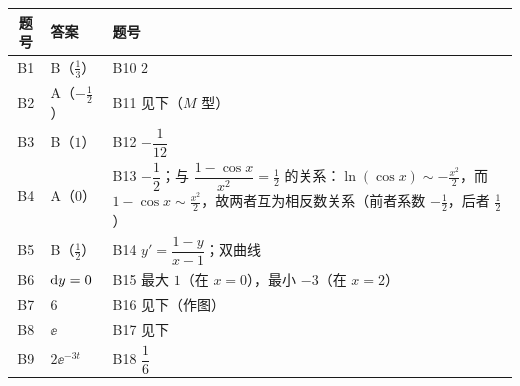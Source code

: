 \begin{center}
\small\setlength{\tabcolsep}{5pt}
\begin{tabularx}{\linewidth}{c|p{3.9cm}|X}
\toprule
题号 & 答案 & 题号\\
\midrule
B1 & B（$\frac13$）& B10 $2$\\
B2 & A（$-\frac12$）& B11 见下（$M$ 型）\\
B3 & B（$1$）& B12 $-\dfrac{1}{12}$\\
B4 & A（$0$）& B13 $-\dfrac{1}{2}$；与 $\dfrac{1-\cos x}{x^{2}}=\frac12$ 的关系：$\ln(\cos x)\sim-\frac{x^{2}}2$，而 $1-\cos x\sim\frac{x^{2}}2$，故两者互为相反数关系（前者系数 $-\frac12$，后者 $\frac12$）\\
B5 & B（$\frac12$）& B14 $y'=\dfrac{1-y}{x-1}$；双曲线\\
B6 & $\mathrm{d} y=0$ & B15 最大 $1$（在 $x=0$），最小 $-3$（在 $x=2$）\\
B7 & $6$ & B16 见下（作图）\\
B8 & $\ee$ & B17 见下\\
B9 & $2\ee^{-3t}$ & B18 $\dfrac{1}{6}$\\
\bottomrule
\end{tabularx}
\end{center}

